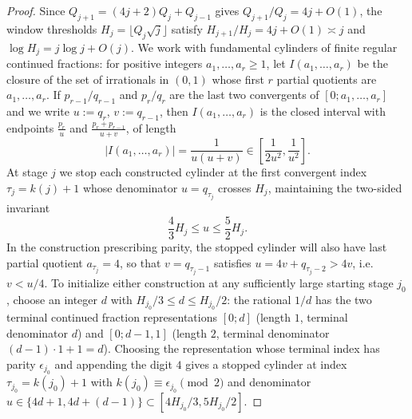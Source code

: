 \begin{proof}
Since $Q_{j+1}=(4j+2)Q_j+Q_{j-1}$ gives $Q_{j+1}/Q_j=4j+O(1)$, the window
thresholds $H_j=\lfloor Q_j\sqrt j\rfloor$ satisfy $H_{j+1}/H_j=4j+O(1)\asymp j$
and $\log H_j=j\log j+O(j)$. We work with fundamental cylinders of finite
regular continued fractions: for positive integers $a_1,\dots,a_r\ge1$, let
$I(a_1,\dots,a_r)$ be the closure of the set of irrationals in $(0,1)$ whose
first $r$ partial quotients are $a_1,\dots,a_r$. If $p_{r-1}/q_{r-1}$ and
$p_r/q_r$ are the last two convergents of $[0;a_1,\dots,a_r]$ and we write
$u:=q_r$, $v:=q_{r-1}$, then $I(a_1,\dots,a_r)$ is the closed interval with
endpoints $\frac{p_r}{u}$ and $\frac{p_r+p_{r-1}}{u+v}$, of length
\[
\bigl|I(a_1,\dots,a_r)\bigr|=\frac{1}{u(u+v)}\in\left[\frac{1}{2u^2},\frac{1}{u^2}\right].
\]
At stage $j$ we stop each constructed cylinder at the first convergent index
$\tau_j=k(j)+1$ whose denominator $u=q_{\tau_j}$ crosses $H_j$, maintaining the
two-sided invariant
\[
\frac43 H_j\le u\le \frac52 H_j.
\]
In the construction prescribing parity, the stopped cylinder will also have
last partial quotient $a_{\tau_j}=4$, so that $v=q_{\tau_j-1}$ satisfies
$u=4v+q_{\tau_j-2}>4v$, i.e.\ $v<u/4$. To initialize either construction at any
sufficiently large starting stage $j_0$, choose an integer $d$ with
$H_{j_0}/3\le d\le H_{j_0}/2$: the rational $1/d$ has the two terminal continued
fraction representations $[0;d]$ (length $1$, terminal denominator $d$) and
$[0;d-1,1]$ (length $2$, terminal denominator $(d-1)\cdot1+1=d$). Choosing the
representation whose terminal index has parity $\epsilon_{j_0}$ and appending
the digit $4$ gives a stopped cylinder at index $\tau_{j_0}=k(j_0)+1$ with
$k(j_0)\equiv\epsilon_{j_0}\pmod2$ and denominator
$u\in\{4d+1,4d+(d-1)\}\subset[4H_{j_0}/3,5H_{j_0}/2]$.


\end{proof}
